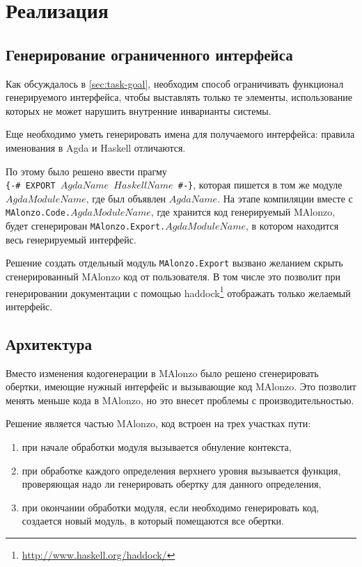 \section{Реализация}

\subsection{Генерирование ограниченного интерфейса}

Как обсуждалось в \ref{sec:task-goal}, необходим способ ограничивать
функционал генерируемого интерфейса, чтобы выставлять только те элементы,
использование которых не может нарушить внутренние инварианты системы.

Еще необходимо уметь генерировать имена для получаемого интерфейса:
правила именования в Agda и Haskell отличаются.

По этому было решено ввести прагму\\
\texttt{\{-\# EXPORT \(AgdaName\) \(HaskellName\) \#-\}},
которая пишется в том же модуле \(AgdaModuleName\), где был объявлен \(AgdaName\). На этапе компиляции
вместе с \texttt{MAlonzo.Code.\(AgdaModuleName\)}, где хранится код генерируемый MAlonzo,
будет сгенерирован \texttt{MAlonzo.Export.\(AgdaModuleName\)}, в котором находится весь генерируемый
интерфейс.

Решение создать отдельный модуль \texttt{MAlonzo.Export} вызвано желанием скрыть
сгенерированный MAlonzo код от пользователя. В том числе это позволит
при генерировании документации с помощью haddock\footnote{\url{http://www.haskell.org/haddock/}}
отображать только желаемый интерфейс.

\subsection{Архитектура}

Вместо изменения кодогенерации в MAlonzo было решено сгенерировать
обертки, имеющие нужный интерфейс и вызывающие код MAlonzo. Это
позволит менять меньше кода в MAlonzo, но это внесет проблемы с производительностью.

Решение является частью MAlonzo, код встроен на трех участках пути:
\begin{enumerate}
\item при начале обработки модуля вызывается обнуление контекста,
\item при обработке каждого определения верхнего уровня вызывается
      функция, проверяющая надо ли генерировать обертку для данного определения,
\item при окончании обработки модуля, если необходимо генерировать код, создается
      новый модуль, в который помещаются все обертки.
\end{enumerate}
